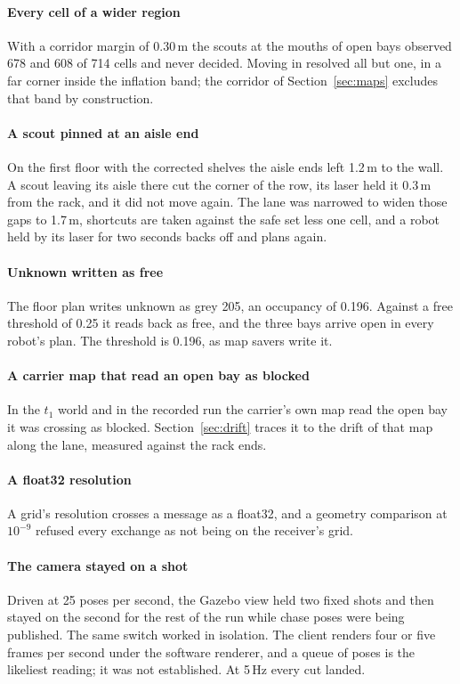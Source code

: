 \documentclass[11pt,a4paper]{article}
\theoremstyle{definition}
\begin{document}
\paragraph{Every cell of a wider region} With a corridor margin of 0.30\,m the
scouts at the mouths of open bays observed 678 and 608 of 714 cells and never
decided. Moving in resolved all but one, in a far corner inside the inflation
band; the corridor of Section~\ref{sec:maps} excludes that band by
construction.

\paragraph{A scout pinned at an aisle end} On the first floor with the corrected
shelves the aisle ends left 1.2\,m to the wall. A scout leaving its aisle there
cut the corner of the row, its laser held it 0.3\,m from the rack, and it did
not move again. The lane was narrowed to widen those gaps to 1.7\,m, shortcuts
are taken against the safe set less one cell, and a robot held by its laser for
two seconds backs off and plans again.

\paragraph{Unknown written as free} The floor plan writes unknown as grey 205,
an occupancy of 0.196. Against a free threshold of 0.25 it reads back as free,
and the three bays arrive open in every robot's plan. The threshold is 0.196,
as map savers write it.

\paragraph{A carrier map that read an open bay as blocked} In the $t_1$ world
and in the recorded run the carrier's own map read the open bay it was
crossing as blocked. Section~\ref{sec:drift} traces it to the drift of that map
along the lane, measured against the rack ends.

\paragraph{A float32 resolution} A grid's resolution crosses a message as a
float32, and a geometry comparison at $10^{-9}$ refused every exchange as not
being on the receiver's grid.

\paragraph{The camera stayed on a shot} Driven at 25 poses per second, the
Gazebo view held two fixed shots and then stayed on the second for the rest of
the run while chase poses were being published. The same switch worked in
isolation. The client renders four or five frames per second under the
software renderer, and a queue of poses is the likeliest reading; it was not
established. At 5\,Hz every cut landed.
\end{document}
